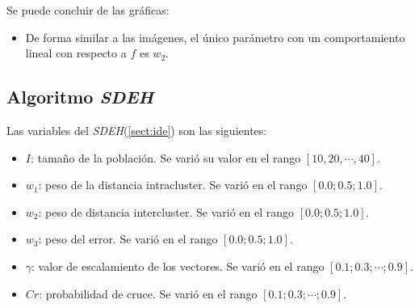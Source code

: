 \begin{figure}[H]
  \centering
  \label{fig:f_de_csv1}
\end{figure}

	Se puede concluir de las gráficas:
\begin{itemize}
	\item De forma similar a las imágenes, el único parámetro con
un comportamiento lineal con respecto a $f$ es $w_2$.
\end{itemize}

\subsection{Algoritmo \emph{SDEH}}\label{sect:isde-rv}

    Las variables del \emph{SDEH}(\ref{sect:ide}) son las siguientes:
\begin{itemize}
    \item $I$: tamaño de la población. Se varió su valor en el rango
$[10, 20, \cdots, 40]$.
    \item $w_1$: peso de la distancia intracluster. Se varió en el rango
$[0.0; 0.5; 1.0]$.
    \item $w_2$: peso de distancia intercluster. Se varió en el rango
$[0.0; 0.5; 1.0]$.
    \item $w_3$: peso del error. Se varió en el rango
$[0.0; 0.5; 1.0]$.
	\item $\gamma$: valor de escalamiento de los vectores. Se varió en el rango
$[0.1; 0.3; \cdots; 0.9]$.
	\item $Cr$: probabilidad de cruce. Se varió en el rango
$[0.1; 0.3; \cdots; 0.9]$.
\end{itemize}

